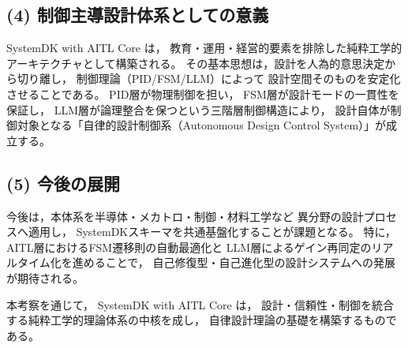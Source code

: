 \subsection{(4) 制御主導設計体系としての意義}
SystemDK with AITL Core は，
教育・運用・経営的要素を排除した純粋工学的アーキテクチャとして構築される。
その基本思想は，設計を人為的意思決定から切り離し，
制御理論（PID/FSM/LLM）によって
設計空間そのものを安定化させることである。
PID層が物理制御を担い，
FSM層が設計モードの一貫性を保証し，
LLM層が論理整合を保つという三階層制御構造により，
設計自体が制御対象となる「自律的設計制御系（Autonomous Design Control System）」が成立する。

\subsection{(5) 今後の展開}
今後は，本体系を半導体・メカトロ・制御・材料工学など
異分野の設計プロセスへ適用し，
SystemDKスキーマを共通基盤化することが課題となる。
特に，AITL層におけるFSM遷移則の自動最適化と
LLM層によるゲイン再同定のリアルタイム化を進めることで，
自己修復型・自己進化型の設計システムへの発展が期待される。

本考察を通じて，
SystemDK with AITL Core は，
設計・信頼性・制御を統合する純粋工学的理論体系の中核を成し，
自律設計理論の基礎を構築するものである。
